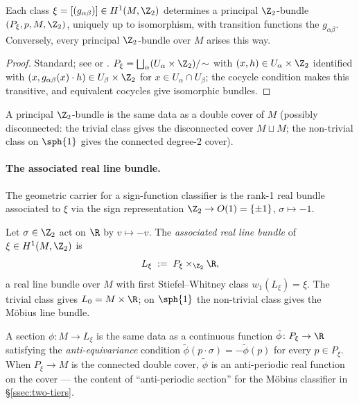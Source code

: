 \begin{lemma}\label{lem:cocycle-bundle}
Each class $\xi=[(g_{\alpha\beta})]\in H^1(M,\Z_2)$ determines a
principal $\Z_2$-bundle $(P_\xi,p,M,\Z_2)$, uniquely up to
isomorphism, with transition functions the $g_{\alpha\beta}$.
Conversely, every principal $\Z_2$-bundle over $M$ arises this way.
\end{lemma}

\begin{proof}
Standard; see \cite[Chapter~4]{Husemoller} or
\cite[\S 4]{Hatcher}.
$P_\xi=\bigsqcup_\alpha(U_\alpha\times\Z_2)/\!\sim$ with
$(x,h)\in U_\alpha\times\Z_2$ identified with
$(x,g_{\alpha\beta}(x)\cdot h)\in U_\beta\times\Z_2$ for
$x\in U_\alpha\cap U_\beta$; the cocycle condition makes this
transitive, and equivalent cocycles give isomorphic bundles.
\end{proof}

A principal $\Z_2$-bundle is the same data as a double cover of $M$
(possibly disconnected: the trivial class gives the disconnected
cover $M\sqcup M$; the non-trivial class on $\sph{1}$ gives the
connected degree-$2$ cover).

\paragraph{The associated real line bundle.} The geometric carrier
for a sign-function classifier is the rank-1 real bundle associated
to $\xi$ via the sign representation $\Z_2\to O(1)=\{\pm 1\}$,
$\sigma\mapsto -1$.

\begin{definition}\label{def:L-xi}
Let $\sigma\in\Z_2$ act on $\R$ by $v\mapsto -v$. The
\emph{associated real line bundle} of $\xi\in H^1(M,\Z_2)$ is
\[
   L_\xi \;:=\; P_\xi \times_{\Z_2} \R,
\]
a real line bundle over $M$ with first Stiefel--Whitney class
$w_1(L_\xi)=\xi$. The trivial class gives $L_0=M\times\R$; on
$\sph{1}$ the non-trivial class gives the M\"obius line bundle.
\end{definition}

\begin{remark}\label{rem:sections-equivariant}
A section $\phi\colon M\to L_\xi$ is the same data as a continuous
function $\tilde\phi\colon P_\xi\to\R$ satisfying the
\emph{anti-equivariance} condition $\tilde\phi(p\cdot\sigma)=-
\tilde\phi(p)$ for every $p\in P_\xi$. When $P_\xi\to M$ is the
connected double cover, $\tilde\phi$ is an anti-periodic real
function on the cover --- the content of ``anti-periodic section''
for the M\"obius classifier in \S\ref{ssec:two-tiers}.
\end{remark}

